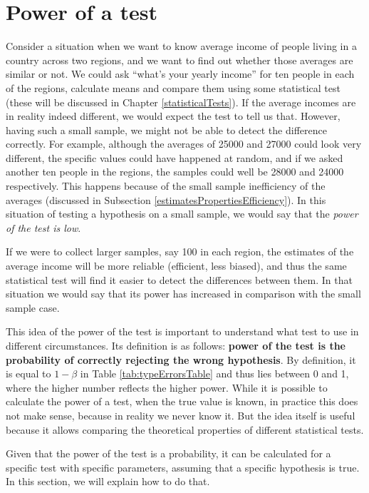 \documentclass[
]{book}
\theoremstyle{definition}
\theoremstyle{definition}
\theoremstyle{definition}
\theoremstyle{definition}
\theoremstyle{remark}
\begin{document}
\section{Power of a test}\label{powerOfTheTest}

Consider a situation when we want to know average income of people living in a country across two regions, and we want to find out whether those averages are similar or not. We could ask ``what's your yearly income'' for ten people in each of the regions, calculate means and compare them using some statistical test (these will be discussed in Chapter \ref{statisticalTests}). If the average incomes are in reality indeed different, we would expect the test to tell us that. However, having such a small sample, we might not be able to detect the difference correctly. For example, although the averages of 25000 and 27000 could look very different, the specific values could have happened at random, and if we asked another ten people in the regions, the samples could well be 28000 and 24000 respectively. This happens because of the small sample inefficiency of the averages (discussed in Subsection \ref{estimatesPropertiesEfficiency}). In this situation of testing a hypothesis on a small sample, we would say that the \emph{power of the test is low}.

If we were to collect larger samples, say 100 in each region, the estimates of the average income will be more reliable (efficient, less biased), and thus the same statistical test will find it easier to detect the differences between them. In that situation we would say that its power has increased in comparison with the small sample case.

This idea of the power of the test is important to understand what test to use in different circumstances. Its definition is as follows: \textbf{power of the test is the probability of correctly rejecting the wrong hypothesis}. By definition, it is equal to \(1-\beta\) in Table \ref{tab:typeErrorsTable} and thus lies between 0 and 1, where the higher number reflects the higher power. While it is possible to calculate the power of a test, when the true value is known, in practice this does not make sense, because in reality we never know it. But the idea itself is useful because it allows comparing the theoretical properties of different statistical tests.

Given that the power of the test is a probability, it can be calculated for a specific test with specific parameters, assuming that a specific hypothesis is true. In this section, we will explain how to do that.
\end{document}
